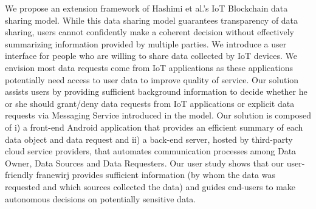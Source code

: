 We propose an extension framework of Hashimi et al.'s \cite{campbell} IoT Blockchain data sharing model. While this data sharing model guarantees transparency of data sharing, users cannot confidently make a coherent decision without effectively summarizing information provided by multiple parties. We introduce a user interface for people who are willing to share data collected by IoT devices. We envision most data requests come from IoT applications as these applications potentially need access to user data to improve quality of service. Our solution assists users by providing sufficient background information to decide whether he or she should grant/deny data requests from IoT applications or explicit data requests via Messaging Service introduced in the model. Our solution is composed of i) a front-end Android application that provides an efficient summary of each data object and data request and ii) a back-end server, hosted by third-party cloud service providers, that automates communication processes among Data Owner, Data Sources and Data Requesters. Our user study shows that our user-friendly franewirj provides sufficient information (by whom the data was requested and which sources collected the data) and guides end-users to make autonomous decisions on potentially sensitive data.